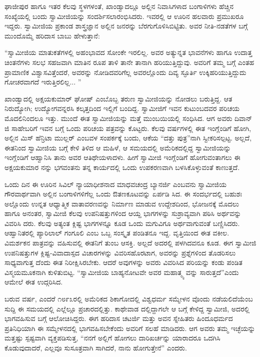 ಘಾಜೀಪುರ ಹಾಗೂ ಇತರ ಕೆಲವು ಸ್ಥಳಗಳಂತೆ, ಖಾಂಡ್ವಾದಲ್ಲೂ ಅಲ್ಲಿನ ನಿವಾಸಿಗಳಾದ ಬಂಗಾಳಿಗಳು ಹೆಚ್ಚಿನ ಸಂಖ್ಯೆಯಲ್ಲಿ ಬಂದು ಸ್ವಾಮೀಜಿಯನ್ನು ಸಂದರ್ಶಿಸಲಾರಂಭಿಸಿದರು. ಇವರಲ್ಲಿ ಆ ಊರಿನ ಹಲವಾರು ಪ್ರಮುಖರೂ ಇದ್ದರು. ಸ್ವಾಮೀಜಿಯ ಪ್ರಕಾಂಡ ಶಾಸ್ತ್ರಜ್ಞಾನ ಅಲ್ಲಿನ ಜನರನ್ನು ಬೆರಗುಗೊಳಿಸಿಬಿಟ್ಟಿತು. ಅವರ ನೀತಿ-ನಡತೆಗಳ ಬಗ್ಗೆ ಮುಂದೊಮ್ಮೆ ಹರಿದಾಸ ಬಾಬು ಹೇಳುತ್ತಾನೆ:

“ಸ್ವಾಮೀಜಿಯ ಮಾತುಕತೆಗಳಲ್ಲಿ ಅಹಂಭಾವದ ಸೋಂಕೇ ಇರಲಿಲ್ಲ. ಅವರ ಅತ್ಯುನ್ನತ ಭಾವನೆಗಳು ಹಾಗೂ ಉದಾತ್ತ ಚಿಂತನೆಗಳು ಸಲಭ ಸಹಜವಾಗಿ ಮಾತಿನ ರೂಪ ತಾಳಿ ತಾನೇ ತಾನಾಗಿ ಹರಿಯುತ್ತಿದ್ದುವು. ಅವರಿಗೆ ತಮ್ಮ ಬಗ್ಗೆ ಎಂತಹ ಪ್ರಾಮಾಣಿಕ ವಿಶ್ವಾಸವಿತ್ತೆಂದರೆ, ಅವರನ್ನು ನೋಡಿದವರಿಗೆಲ್ಲ ಅವರಲ್ಲೊಂದು ದಿವ್ಯ ಸ್ಫೂರ್ತಿ ಉಕ್ಕಿಹರಿಯುತ್ತಿದ್ದುದು ಗೋಚರವಾಗದೆ ಇರುತ್ತಿರಲಿಲ್ಲ... ”

ಖಾಂಡ್ವಾದಲ್ಲಿ ಅಕ್ಷಯಕುಮಾರ್ ಘೋಷ್ ಎಂಬೊಬ್ಬ ತರುಣ ಸ್ವಾಮೀಜಿಯನ್ನು ನೋಡಲು ಬರುತ್ತಿದ್ದ. ಆತ ನಿರುದ್ಯೋಗಿ; ಉದ್ಯೋಗವನ್ನರಸಿ ಕಲ್ಕತ್ತದಿಂದ ಇಲ್ಲಿಗೆ ಬಂದಿದ್ದ. ಸ್ವಾಮೀಜಿಗೆ ಇವನ ಕುಟುಂಬದವರ ಪರಿಚಯ ಮೊದಲಿನಿಂದಲೂ ಇತ್ತು. ಮುಂದೆ ಈತ ಸ್ವಾಮೀಜಿಯನ್ನು ಮತ್ತೆ ಮುಂಬಯಿಯಲ್ಲಿ ಸಂಧಿಸಿದ. ಆಗ ಅವರು ದಿವಾನ್​ಜಿ ಸಾಹೇಬರಿಗೆ ಇವನ ಬಗ್ಗೆ ಒಂದು ಪರಿಚಯ ಪತ್ರವನ್ನು ಕೊಟ್ಟರು. ಕೆಲವು ವರ್ಷಗಳಲ್ಲಿ ಈತ ಇಂಗ್ಲೆಂಡಿಗೆ ಹೋಗಿ, ಅಲ್ಲಿನ ಮಿಸ್ ಹೆನ್ರಿಟಾ ಮುಲ್ಲರ್ ಎಂಬವಳ ಸಂಪರ್ಕಕ್ಕೆ ಬಂದು, ಆಕೆಯ “ದತ್ತು ಪುತ್ರ”ನಾಗಿ ಸ್ವೀಕರಿಸಲ್ಪಟ್ಟ. ಅಲ್ಲದೆ, ಈತನಿಂದ ಸ್ವಾಮೀಜಿಯ ಬಗ್ಗೆ ಕೇಳಿ ತಿಳಿದ ಆ ಮಹಿಳೆ, ಆ ಸಮಯದಲ್ಲಿ ಅಮೆರಿಕದಲ್ಲಿದ್ದ ಸ್ವಾಮೀಜಿಯನ್ನು ಇಂಗ್ಲೆಂಡಿಗೆ ಆಹ್ವಾನಿಸಿ ತಾನು ಅವರ ಆತಿಥೇಯಳಾದಳು. ಹೀಗೆ ಸ್ವಾಮೀಜಿ ಇಂಗ್ಲೆಂಡಿಗೆ ಹೋಗುವಂತಾಗಲು ಈ ಅಕ್ಷಯಕುಮಾರ ನನ್ನು ಭಗವಂತನು ತನ್ನ ಕಾರ್ಯದಲ್ಲಿ ಒಂದು ಉಪಕರಣವಾಗಿ ಬಳಸಿಕೊಳ್ಳುವಂತೆ ಕಾಣುತ್ತದೆ.

ಒಂದು ದಿನ ಈ ಊರಿನ ಸಿವಿಲ್ ನ್ಯಾಯಾಧೀಶನಾದ ಮಾಧವಚಂದ್ರ ಬ್ಯಾನರ್ಜಿ ಎಂಬವನು ಸ್ವಾಮೀಜಿಯ ಗೌರವಾರ್ಥವಾಗಿ ಅಲ್ಲಿನ ಬಂಗಾಳಿಗಳಿಗೆಲ್ಲ ಒಂದು ಔತಣಕೂಟವನ್ನು ಏರ್ಪಡಿ ಸಿದ. ಈ ಸಂದರ್ಭದಲ್ಲಿ ಬಹುಶಃ ಅಲ್ಲೊಂದು ಉನ್ನತ ಆಧ್ಯಾತ್ಮಿಕ ವಾತಾವರಣವನ್ನು ನಿರ್ಮಾಣ ಮಾಡುವ ಉದ್ದೇಶದಿಂದ, ಭೋಜನಕ್ಕೆ ಮೊದಲು ಹಾಗೂ ಅನಂತರ, ಸ್ವಾಮೀಜಿ ಕೆಲವು ಉಪನಿಷತ್ತುಗಳಿಂದ ಆಯ್ದ ಭಾಗಗಳನ್ನು ಸುಶ್ರಾವ್ಯವಾಗಿ ಪಠಿಸಿ ಅರ್ಥವನ್ನು ವಿವರಿಸಿ ದರು. ಕೆಲವು ಅತ್ಯಂತ ಕ್ಲಿಷ್ಟ ಭಾಗಗಳನ್ನೂ ಕೂಡ ಒಂದು ಮಗುವಿಗೂ ಅರ್ಥವಾಗುವಂತೆ ಬಣ್ಣಿಸಿದರು. ಆಹ್ವಾನಿತರಲ್ಲಿ ಪ್ಯಾರಿಲಾಲ್ ಗಂಗೂಲಿ ಎಂಬ ಒಬ್ಬ ಸಂಸ್ಕೃತ ಪಂಡಿತನೂ ಇದ್ದ. ವೃತ್ತಿಯಿಂದ ಈತ ವಕೀಲ. ವಿಮರ್ಶಕನ ಪಾತ್ರವನ್ನು ವಹಿಸುವಲ್ಲಿ ಈತನಿಗೆ ತುಂಬ ಆಸಕ್ತಿ. ಅಲ್ಲದೆ ಅದರಲ್ಲಿ ಪಳಗಿದವನೂ ಕೂಡ. ಈಗ ಸ್ವಾಮೀಜಿ ಉಪನಿಷತ್ತುಗಳ ಕ್ಲಿಷ್ಟ-ವಿವಾದಾಸ್ಪದ ವಿಚಾರಗಳನ್ನು ವಿವರಿಸಹೊರಟಾಗ, ಅವರನ್ನು ಪ್ರಶ್ನೆಗಳಿಂದ ತೊಡರಿಸಲು ಸಾಧ್ಯವಾಗುತ್ತ ದೆಂದು ಈತ ನಿರೀಕ್ಷಿಸಿರಬೇಕು. ಆದರೆ ಅವುಗಳನ್ನು ಅವರು ವಿವರಿಸಿದ ಪರಿಯನ್ನು ಕಂಡು ಪಂಡಿತ ವಿಸ್ಮಯಮೂಕನಾಗಿ ಕುಳಿತುಬಿಟ್ಟ. “ಸ್ವಾಮೀಜಿಯ ಬಾಹ್ಯನೋಟವೇ ಅವರ ಮಹಾತ್ಮ್ಯ ವನ್ನು ಸಾರುತ್ತದೆ”ಎಂದು ಆಮೇಲೆ ಈತ ಉದ್ಗರಿಸಿದ.

ಬರುವ ವರ್ಷ, ಎಂದರೆ ೧೮೯೩ರಲ್ಲಿ ಅಮೆರಿಕದ ಶಿಕಾಗೋದಲ್ಲಿ ವಿಶ್ವಧರ್ಮ ಸಮ್ಮೇಳನ ವೊಂದು ನಡೆಯಲಿದೆಯೆಂಬ ಸುದ್ದಿ ಈ ಸಮಯದಲ್ಲಿ ಎಲ್ಲೆಲ್ಲೂ ಪ್ರಚಾರದಲ್ಲಿತ್ತು. ಕಾಥೇವಾಡ ದಲ್ಲಿದ್ದಾಗಲೇ ಆ ಬಗ್ಗೆ ಕೇಳಿದ್ದ ಸ್ವಾಮೀಜಿ, ಅದರಲ್ಲಿ ಭಾಗವಹಿಸುವ ಬಗ್ಗೆ ಆಲೋಚಿಸಿದ್ದರು. ಈಗ ಹರಿದಾಸ ಚಟರ್ಜಿ ಮತ್ತು ಅವನ ಸ್ನೇಹಿತರು ಹಿಂದೂಧರ್ಮದ ಪ್ರತಿನಿಧಿಯಾಗಿ ಈ ಸಮ್ಮೇಳನದಲ್ಲಿ ಭಾಗವಹಿಸಬೇಕೆಂದು ಅವರಿಗೆ ಸಲಹೆ ಮಾಡಿದರು. ಆಗ ಅವರು ತಮ್ಮ ಇಚ್ಛೆಯನ್ನು ಮತ್ತಷ್ಟು ಸ್ಪಷ್ಟವಾಗಿ ವ್ಯಕ್ತಪಡಿಸುತ್ತ, “ನನಗೆ ಅಲ್ಲಿಗೆ ಹೋಗಲು ದಾರಿಖರ್ಚನ್ನು ಯಾರಾದರೂ ಒದಗಿಸಿ ಕೊಡುವುದಾದರೆ, ಎಲ್ಲವೂ ಸುಸೂತ್ರವಾಗಿ ಸಾಗಿದರೆ, ನಾನು ಹೋಗುತ್ತೇನೆ” ಎಂದರು.


